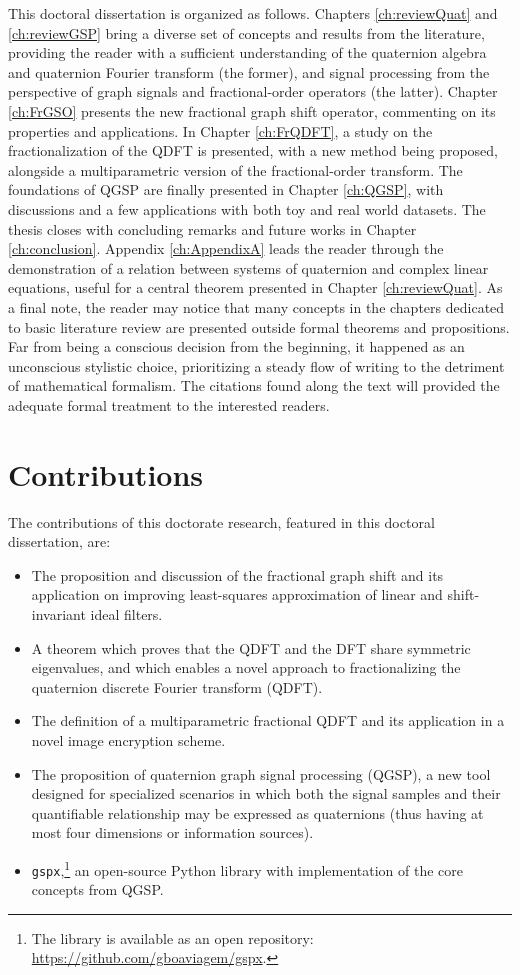 This doctoral dissertation is organized as follows. Chapters \ref{ch:reviewQuat} and \ref{ch:reviewGSP} bring a diverse set of concepts and results from the literature, providing the reader with a sufficient understanding of the quaternion algebra and quaternion Fourier transform (the former), and signal processing from the perspective of graph signals and fractional-order operators (the latter).
Chapter \ref{ch:FrGSO} presents the new fractional graph shift operator, commenting on its properties and applications.
In Chapter \ref{ch:FrQDFT}, a study on the fractionalization of the QDFT is presented, with a new method being proposed, alongside a multiparametric version of the fractional-order transform.
The foundations of QGSP are finally presented in Chapter \ref{ch:QGSP}, with discussions and a few applications with both toy and real world datasets.
The thesis closes with concluding remarks and future works in Chapter \ref{ch:conclusion}. Appendix \ref{ch:AppendixA} leads the reader through the demonstration of a relation between systems of quaternion and complex linear equations, useful for a central theorem presented in Chapter \ref{ch:reviewQuat}. As a final note, the reader may notice that many concepts in the chapters dedicated to basic literature review are presented outside formal theorems and propositions. Far from being a conscious decision from the beginning, it happened as an unconscious stylistic choice, prioritizing a steady flow of writing to the detriment of mathematical formalism. The citations found along the text will provided the adequate formal treatment to the interested readers.

\section{Contributions}
The contributions of this doctorate research, featured in this doctoral dissertation, are:

\vspace{-1em}
\begin{itemize}[noitemsep]
    \item The proposition and discussion of the fractional graph shift and its application on improving least-squares approximation of linear and shift-invariant ideal filters.
    \item A theorem which proves that the QDFT and the DFT share symmetric eigenvalues, and which enables a novel approach to fractionalizing the quaternion discrete Fourier transform (QDFT).
    \item The definition of a multiparametric fractional QDFT and its application in a novel image encryption scheme.
    \item The proposition of quaternion graph signal processing (QGSP), a new tool designed for specialized scenarios in which both the signal samples and their quantifiable relationship may be expressed as quaternions (thus having at most four dimensions or information sources).
    \item \texttt{gspx},\footnote{The library is available as an open repository: \url{https://github.com/gboaviagem/gspx}.} an open-source Python library with implementation of the core concepts from QGSP.
\end{itemize}
\vspace{-1em}
